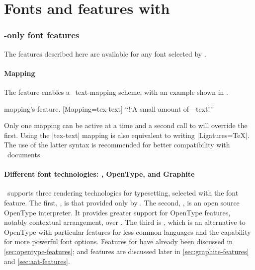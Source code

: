 \documentclass[a4paper]{l3doc}
\begin{document}
\part{Fonts and features with \XeTeX}
\label{sec:xetex-features}

\section{\XeTeX-only font features}

The features described here are available for any font
selected by .

\subsection{Mapping}
\label{sec:mapping}

The  feature enables a \XeTeX\ text-mapping scheme, with an example shown in .

\begin{Xexample}{mapping}{\XeTeX's  feature.}
  [Mapping=tex-text]
  ``!`A small amount of---text!''
\end{Xexample}

Only one mapping can be active at a time and a second call to 
will override the first.
Using the |tex-text| mapping is also equivalent to writing |Ligatures=TeX|.
The use of the latter syntax is recommended for better compatibility with
\LuaTeX\ documents.


\subsection{Different font technologies: \AAT, OpenType, and Graphite}\label{sec:renderer-xetex}

\XeTeX\ supports three rendering technologies for typesetting, selected with
the  font feature. The first, , is
that provided only by \MacOSX.
The second, , is an open source OpenType interpreter.
It provides greater support for OpenType features, notably contextual arrangement, over .
The third is , which is an alternative to OpenType with particular features for less-common languages and the capability for more powerful font options.
Features for  have already been discussed in \vref{sec:opentype-features};
 and  features are discussed later in \vref{sec:graphite-features} and \vref{sec:aat-features}.
\end{document}
